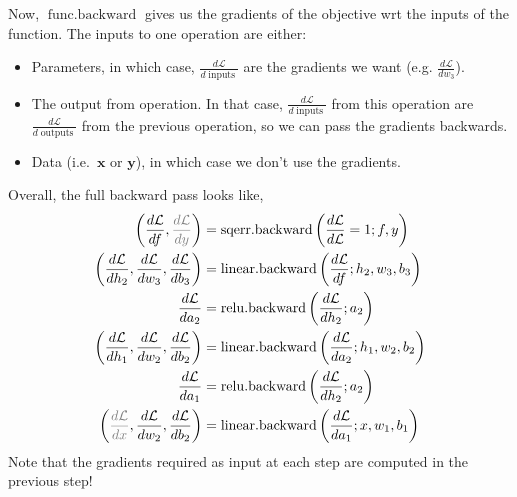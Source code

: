 \documentclass{article}
\newcommand{\dt}[2][]{\frac{d #1}{d #2}}
\newcommand{\dL}{\dt[\L]}
\newcommand{\bracket}[3]{\left#1 #3 \right#2}
\renewcommand{\b}{\bracket{(}{)}}
\newcommand{\x}{\mathbf{x}}
\newcommand{\y}{\mathbf{y}}
\newcommand{\h}{\mathbf{h}}
\newcommand{\bv}{\mathbf{b}}
\renewcommand{\a}{\mathbf{a}}
\newcommand{\W}{\mathbf{W}}
\renewcommand{\L}{\mathcal{L}}
\newcommand{\linear}{\operatorname{linear}}
\newcommand{\relu}{\operatorname{relu}}
\newcommand{\funcback}{\operatorname{func{.}backward}}
\newcommand{\inputs}{\operatorname{inputs}}
\newcommand{\outputs}{\operatorname{outputs}}
\newcommand{\linearback}{\operatorname{linear{.}backward}}
\newcommand{\reluback}{\operatorname{relu{.}backward}}
\newcommand{\sqerrback}{\operatorname{sqerr{.}backward}}
\begin{document}
Now, $\funcback$ gives us the gradients of the objective wrt the inputs of the function. 
The inputs to one operation are either:
\begin{itemize}
  \item Parameters, in which case, $\dL{\inputs}$ are the gradients we want (e.g. $\dL{w_3}$).
  \item The output from operation. In that case, $\dL{\inputs}$ from this operation are $\dL{\outputs}$ from the previous operation, so we can pass the gradients backwards.
  \item Data (i.e.\ $\x$ or $\y$), in which case we don't use the gradients.
\end{itemize}
Overall, the full backward pass looks like,
\begin{subequations}
\label{eq:backward}
\begin{align}
  \b{\dL{f}, \textcolor{gray}{\dL{y}}} &= \sqerrback\b{\dL{\L}=1; f, y}\\
  \b{\dL{h_2}, \dL{w_3}, \dL{b_3}} &= \linearback\b{\dL{f}; h_2, w_3, b_3}\\
  \dL{a_2} &= \reluback\b{\dL{h_2}; a_2}\\
  \b{\dL{h_1}, \dL{w_2}, \dL{b_2}} &= \linearback\b{\dL{a_2}; h_1, w_2, b_2}\\
  \dL{a_1} &= \reluback\b{\dL{h_2}; a_2}\\
  \b{\textcolor{gray}{\dL{x}}, \dL{w_2}, \dL{b_2}} &= \linearback\b{\dL{a_1}; x, w_1, b_1}
\end{align}
\end{subequations}
Note that the gradients required as input at each step are computed in the previous step!
\end{document}
